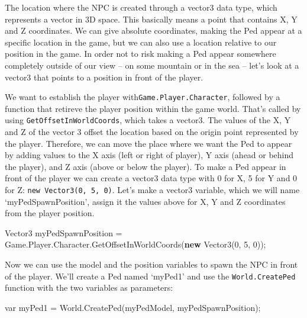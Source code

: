 \documentclass[
  openany]{book}
\newenvironment{Shaded}{\begin{snugshade}}{\end{snugshade}}
\newcommand{\DataTypeTok}[1]{\textcolor[rgb]{0.13,0.29,0.53}{#1}}
\newcommand{\DecValTok}[1]{\textcolor[rgb]{0.00,0.00,0.81}{#1}}
\newcommand{\FunctionTok}[1]{\textcolor[rgb]{0.00,0.00,0.00}{#1}}
\newcommand{\KeywordTok}[1]{\textcolor[rgb]{0.13,0.29,0.53}{\textbf{#1}}}
\newcommand{\NormalTok}[1]{#1}
\begin{document}
The location where the NPC is created through a vector3 data type, which represents a vector in 3D space. This basically means a point that contains X, Y and Z coordinates. We can give absolute coordinates, making the Ped appear at a specific location in the game, but we can also use a location relative to our position in the game. In order not to risk making a Ped appear somewhere completely outside of our view -- on some mountain or in the sea -- let's look at a vector3 that points to a position in front of the player.

We want to establish the player with\texttt{Game.Player.Character}, followed by a function that retireve the player position within the game world. That's called by using \texttt{GetOffsetInWorldCoords}, which takes a vector3. The values of the X, Y and Z of the vector 3 offset the location based on the origin point represented by the player. Therefore, we can move the place where we want the Ped to appear by adding values to the X axis (left or right of player), Y axis (ahead or behind the player), and Z axis (above or below the player).
To make a Ped appear in front of the player we can create a vector3 data type with 0 for X, 5 for Y and 0 for Z: \texttt{new\ Vector3(0,\ 5,\ 0)}. Let's make a vector3 variable, which we will name `myPedSpawnPosition', assign it the values above for X, Y and Z coordinates from the player position.

\begin{Shaded}
\begin{Highlighting}[]
\NormalTok{Vector3 myPedSpawnPosition = Game.}\FunctionTok{Player}\NormalTok{.}\FunctionTok{Character}\NormalTok{.}\FunctionTok{GetOffsetInWorldCoords}\NormalTok{(}\KeywordTok{new} \FunctionTok{Vector3}\NormalTok{(}\DecValTok{0}\NormalTok{, }\DecValTok{5}\NormalTok{, }\DecValTok{0}\NormalTok{));}
\end{Highlighting}
\end{Shaded}

Now we can use the model and the position variables to spawn the NPC in front of the player. We'll create a Ped named `myPed1' and use the \texttt{World.CreatePed} function with the two variables as parameters:

\begin{Shaded}
\begin{Highlighting}[]
\DataTypeTok{var}\NormalTok{ myPed1 = World.}\FunctionTok{CreatePed}\NormalTok{(myPedModel, myPedSpawnPosition); }
\end{Highlighting}
\end{Shaded}
\end{document}
